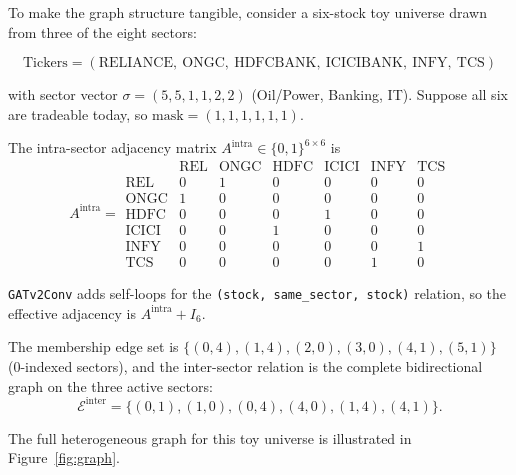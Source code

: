 \documentclass[11pt,a4paper]{article}
\begin{document}
To make the graph structure tangible, consider a six-stock toy universe drawn from
three of the eight sectors:

\[
\text{Tickers} = (\text{RELIANCE},\ \text{ONGC},\ \text{HDFCBANK},\ \text{ICICIBANK},\ \text{INFY},\ \text{TCS})
\]

with sector vector $\sigma = (5, 5, 1, 1, 2, 2)$ (Oil/Power, Banking, IT). Suppose
all six are tradeable today, so $\text{mask} = (1,1,1,1,1,1)$.

The intra-sector adjacency matrix $A^{\text{intra}} \in \{0,1\}^{6 \times 6}$ is
\[
A^{\text{intra}} =
\begin{array}{r|cccccc}
       & \text{REL} & \text{ONGC} & \text{HDFC} & \text{ICICI} & \text{INFY} & \text{TCS} \\ \hline
\text{REL}   & 0 & 1 & 0 & 0 & 0 & 0 \\
\text{ONGC}  & 1 & 0 & 0 & 0 & 0 & 0 \\
\text{HDFC}  & 0 & 0 & 0 & 1 & 0 & 0 \\
\text{ICICI} & 0 & 0 & 1 & 0 & 0 & 0 \\
\text{INFY}  & 0 & 0 & 0 & 0 & 0 & 1 \\
\text{TCS}   & 0 & 0 & 0 & 0 & 1 & 0
\end{array}
\]

\texttt{GATv2Conv} adds self-loops for the \texttt{(stock, same\_sector, stock)} relation,
so the effective adjacency is $A^{\text{intra}} + I_6$.

The membership edge set is
$\{(0, 4), (1, 4), (2, 0), (3, 0), (4, 1), (5, 1)\}$
(0-indexed sectors), and the inter-sector relation is the complete bidirectional graph
on the three active sectors:
\[ \mathcal{E}^{\text{inter}} = \{ (0,1), (1,0), (0,4), (4,0), (1,4), (4,1) \}. \]

The full heterogeneous graph for this toy universe is illustrated in
Figure~\ref{fig:graph}.
\end{document}
